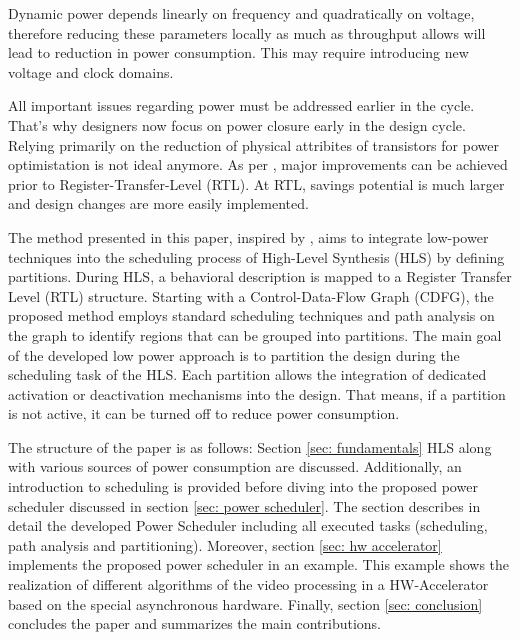 \documentclass[conference]{IEEEtran}
\begin{document}
Dynamic power depends linearly on frequency and quadratically on voltage, therefore reducing these parameters locally as much as throughput allows will lead to reduction in power consumption. This may require introducing new voltage and clock domains. 

All important issues regarding power must be addressed earlier in the cycle. That's why designers now focus on power closure early in the design cycle. Relying primarily on the reduction of physical attribites of transistors  for power optimistation is not ideal anymore. As per \cite{Ret}, major improvements can be achieved prior to Register-Transfer-Level (RTL). At RTL, savings potential is much larger and design changes are more easily implemented. 


The method presented in this paper, inspired by \cite{Ret}, aims to integrate low-power techniques into the scheduling process of High-Level Synthesis (HLS) by defining partitions. During HLS, a behavioral description is mapped to a Register Transfer Level (RTL) structure. Starting with a Control-Data-Flow Graph (CDFG), the proposed method employs standard scheduling techniques and path analysis on the graph to identify regions that can be grouped into partitions. The main goal of the developed low power approach is to partition the design during the scheduling task of the HLS. Each partition allows the integration of dedicated activation or deactivation mechanisms into the design. That means, if a partition is not active, it can be turned off to reduce power consumption.


The structure of the paper is as follows: Section \ref{sec: fundamentals} HLS along with various sources of power consumption are discussed. Additionally, an introduction to scheduling is provided before diving into the proposed power scheduler discussed in section \ref{sec: power scheduler}. The section describes in detail the developed Power Scheduler including all executed tasks (scheduling, path analysis and partitioning). Moreover, section \ref{sec: hw accelerator} implements the proposed power scheduler in an example. This example shows the realization of different algorithms of the video processing in a HW-Accelerator based on the special asynchronous hardware. Finally, section \ref{sec: conclusion} concludes the paper and summarizes the main contributions. 
\end{document}
